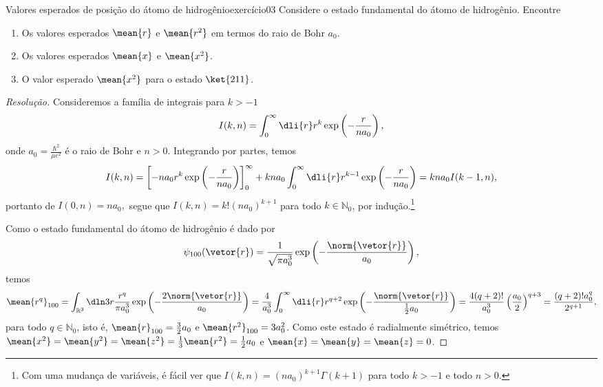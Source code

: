 \begin{exercício}{Valores esperados de posição do átomo de hidrogênio}{exercício03}
    Considere o estado fundamental do átomo de hidrogênio. Encontre
    \begin{enumerate}[label=(\alph*)]
        \item Os valores esperados \(\mean{r}\) e \(\mean{r^2}\) em termos do raio de Bohr \(a_0\).
        \item Os valores esperados \(\mean{x}\) e \(\mean{x^2}\).
        \item O valor esperado \(\mean{x^2}\) para o estado \(\ket{211}\).
    \end{enumerate}
\end{exercício}
\begin{proof}[Resolução]
    Consideremos a família de integrais para \(k > -1\)
    \begin{equation*}
        I(k, n) = \int_0^\infty \dli{r} r^k \exp\left(-\frac{r}{n a_0}\right),
    \end{equation*}
    onde \(a_0 = \frac{\hbar^2}{\mu e^2}\) é o raio de Bohr e \(n > 0\). Integrando por partes, temos
    \begin{equation*}
        I(k, n) = \left[-n a_0 r^k \exp\left(-\frac{r}{n a_0}\right)\right]_0^\infty + kn a_0 \int_0^\infty \dli{r} r^{k-1}\exp\left(-\frac{r}{n a_0}\right) = kn a_0 I(k - 1, n),
    \end{equation*}
    portanto de \(I(0,n) = na_0,\) segue que \(I(k,n) = k!(na_0)^{k+1}\) para todo \(k \in \mathbb{N}_0\), por indução.\footnote{Com uma mudança de variáveis, é fácil ver que \(I(k,n) = (na_0)^{k+1} \Gamma(k+1)\) para todo \(k > -1\) e todo \(n > 0\).}

    Como o estado fundamental do átomo de hidrogênio é dado por
    \begin{equation*}
        \psi_{100}(\vetor{r}) = \frac{1}{\sqrt{\pi a_0^3}} \exp\left(-\frac{\norm{\vetor{r}}}{a_0}\right),
    \end{equation*}
    temos
    \begin{equation*}
        \mean{r^q}_{100} = \int_{\mathbb{R}^3} \dln3r \frac{r^q}{\pi a_0^3} \exp\left(-\frac{2\norm{\vetor{r}}}{a_0}\right) = \frac{4}{a_0^3} \int_{0}^\infty \dli{r} r^{q+2} \exp\left(-\frac{\norm{\vetor{r}}}{\frac12 a_0}\right) = \frac{4 (q + 2)!}{a_0^3}\left(\frac{a_0}{2}\right)^{q + 3} = \frac{(q + 2)!a_0^q}{2^{q+1}},
    \end{equation*}
    para todo \(q \in \mathbb{N}_0\), isto é, \(\mean{r}_{100} = \frac{3}{2}a_0\) e \(\mean{r^2}_{100} = 3a_0^2\). Como este estado é radialmente simétrico, temos \(\mean{x^2} = \mean{y^2} = \mean{z^2} = \frac13 \mean{r^2} = \frac12 a_0\) e \(\mean{x} = \mean{y} = \mean{z} = 0\).


\end{proof}
